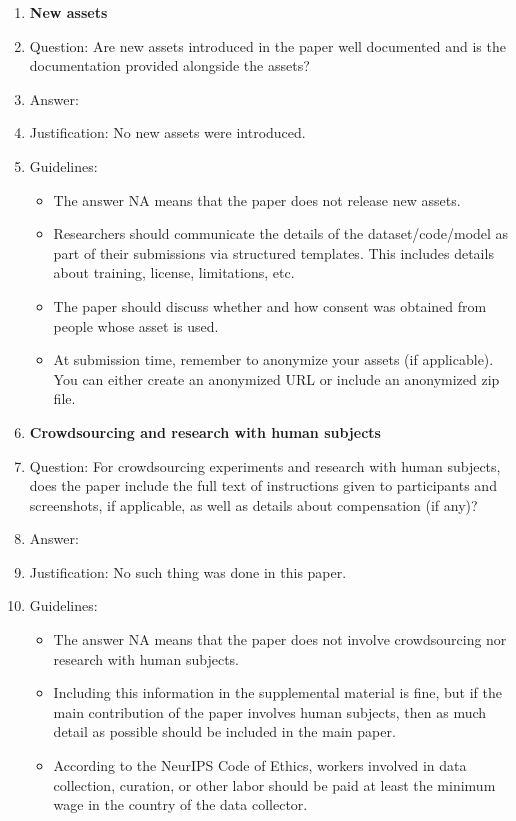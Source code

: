 \documentclass{article}
\theoremstyle{plain}
\theoremstyle{definition}
\begin{document}
\begin{enumerate}
\item {\bf New assets}
    \item[] Question: Are new assets introduced in the paper well documented and is the documentation provided alongside the assets?
    \item[] Answer: \answerNA{} 
    \item[] Justification: No new assets were introduced.
    \item[] Guidelines:
    \begin{itemize}
        \item The answer NA means that the paper does not release new assets.
        \item Researchers should communicate the details of the dataset/code/model as part of their submissions via structured templates. This includes details about training, license, limitations, etc. 
        \item The paper should discuss whether and how consent was obtained from people whose asset is used.
        \item At submission time, remember to anonymize your assets (if applicable). You can either create an anonymized URL or include an anonymized zip file.
    \end{itemize}

\item {\bf Crowdsourcing and research with human subjects}
    \item[] Question: For crowdsourcing experiments and research with human subjects, does the paper include the full text of instructions given to participants and screenshots, if applicable, as well as details about compensation (if any)? 
    \item[] Answer: \answerNA{} 
    \item[] Justification: No such thing was done in this paper.
    \item[] Guidelines:
    \begin{itemize}
        \item The answer NA means that the paper does not involve crowdsourcing nor research with human subjects.
        \item Including this information in the supplemental material is fine, but if the main contribution of the paper involves human subjects, then as much detail as possible should be included in the main paper. 
        \item According to the NeurIPS Code of Ethics, workers involved in data collection, curation, or other labor should be paid at least the minimum wage in the country of the data collector. 
    \end{itemize}


\end{enumerate}
\end{document}

